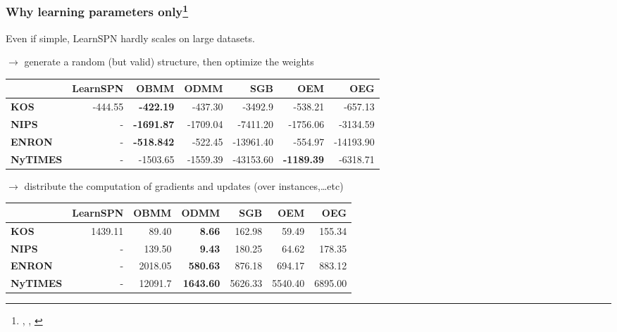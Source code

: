 \documentclass[10pt, t, xcolor={usenames,dvipsnames,svgnames}, compress]{beamer}
\newcommand{\customcite}[1]{\footnote{\scriptsize \citeauthor{#1}, \citetitle{#1}, \citeyear{#1}}}
\begin{document}
\begin{frame}
  \frametitle{Why learning parameters only\customcite{Rashwan2016}}
  Even if simple, \textsf{LearnSPN} hardly scales on large datasets.\par
  $\rightarrow$ generate a random (but valid) structure, then optimize the weights
  \begin{table}
    \centering
    \scriptsize
    \setlength{\tabcolsep}{3pt}  
    \begin{tabular}{l r r r r r r}
      \toprule
      & \textsf{LearnSPN}& \textsf{OBMM} & \textsf{ODMM} & \textsf{SGB} & \textsf{OEM} & \textsf{OEG} \\
      \midrule
      \textbf{KOS} & -444.55 & \textbf{-422.19} & -437.30 & -3492.9 & -538.21 & -657.13\\
      \textbf{NIPS} & - &  \textbf{-1691.87}& -1709.04& -7411.20& -1756.06 & -3134.59 \\
      \textbf{ENRON} & - &\textbf{-518.842}& -522.45& -13961.40& -554.97 & -14193.90\\
      \textbf{NyTIMES} & - & -1503.65& -1559.39& -43153.60& \textbf{-1189.39} & -6318.71\\
      \bottomrule
    \end{tabular}
    \label{tab:model-accs}
  \end{table}

  $\rightarrow$ distribute the computation of gradients and updates
  (over instances,\dots etc)
  \begin{table}
    \centering
    \scriptsize
    \setlength{\tabcolsep}{3pt}  
    \begin{tabular}{l r r r r r r}
      \toprule
      & \textsf{LearnSPN}& \textsf{OBMM} & \textsf{ODMM} & \textsf{SGB} & \textsf{OEM} & \textsf{OEG} \\
      \midrule
      \textbf{KOS} & 1439.11 & 89.40 & \textbf{8.66} & 162.98 & 59.49 & 155.34\\
      \textbf{NIPS} & - &  139.50& \textbf{9.43}& 180.25& 64.62 & 178.35 \\
      \textbf{ENRON} & - &2018.05& \textbf{580.63}& 876.18& 694.17 & 883.12\\
      \textbf{NyTIMES} & - & 12091.7& \textbf{1643.60}& 5626.33& 5540.40 & 6895.00\\
      \bottomrule
    \end{tabular}
    \label{tab:model-accs}
  \end{table}
\end{frame}
\end{document}
